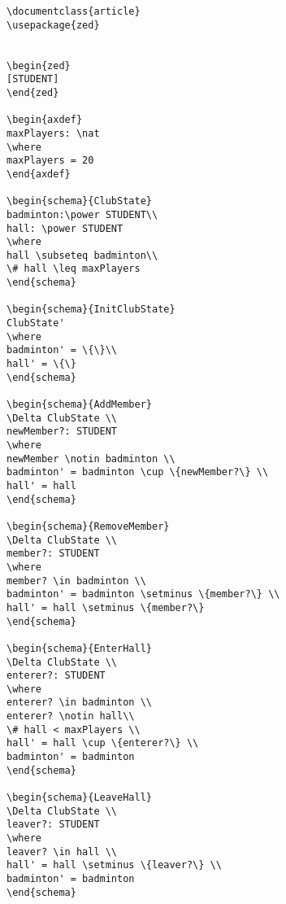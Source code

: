 \begin{verbatim}
\documentclass{article}
\usepackage{zed}


\begin{zed}
[STUDENT]
\end{zed}

\begin{axdef}
maxPlayers: \nat
\where
maxPlayers = 20
\end{axdef}

\begin{schema}{ClubState}
badminton:\power STUDENT\\
hall: \power STUDENT
\where
hall \subseteq badminton\\
\# hall \leq maxPlayers
\end{schema}

\begin{schema}{InitClubState}
ClubState'
\where
badminton' = \{\}\\
hall' = \{\}
\end{schema}

\begin{schema}{AddMember}
\Delta ClubState \\
newMember?: STUDENT
\where
newMember \notin badminton \\
badminton' = badminton \cup \{newMember?\} \\
hall' = hall
\end{schema}

\begin{schema}{RemoveMember}
\Delta ClubState \\
member?: STUDENT
\where
member? \in badminton \\
badminton' = badminton \setminus \{member?\} \\
hall' = hall \setminus \{member?\}
\end{schema}

\begin{schema}{EnterHall}
\Delta ClubState \\
enterer?: STUDENT
\where
enterer? \in badminton \\
enterer? \notin hall\\
\# hall < maxPlayers \\
hall' = hall \cup \{enterer?\} \\
badminton' = badminton
\end{schema}

\begin{schema}{LeaveHall}
\Delta ClubState \\
leaver?: STUDENT
\where
leaver? \in hall \\
hall' = hall \setminus \{leaver?\} \\
badminton' = badminton
\end{schema}


\end{verbatim}
